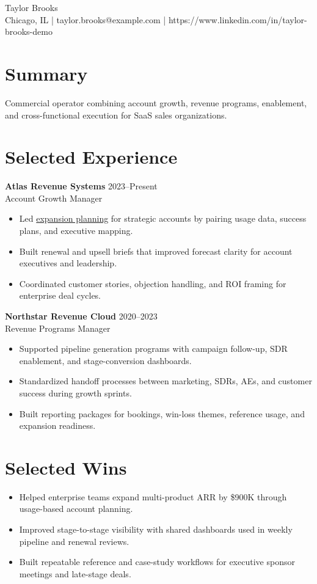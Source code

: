 \documentclass[10pt]{article}
\begin{document}
\begin{center}
  {\LARGE Taylor Brooks}\\
  Chicago, IL \quad | \quad taylor.brooks@example.com \quad | \quad
  https://www.linkedin.com/in/taylor-brooks-demo
\end{center}

\section*{Summary}
Commercial operator combining account growth, revenue programs, enablement, and
cross-functional execution for SaaS sales organizations.

\section*{Selected Experience}
\textbf{Atlas Revenue Systems} \hfill 2023--Present\\
Account Growth Manager
\begin{itemize}
  \item Led \underline{expansion planning} for strategic accounts by pairing usage data, success plans, and executive mapping.
  \item Built renewal and upsell briefs that improved forecast clarity for account executives and leadership.
  \item Coordinated customer stories, objection handling, and ROI framing for enterprise deal cycles.
\end{itemize}

\textbf{Northstar Revenue Cloud} \hfill 2020--2023\\
Revenue Programs Manager
\begin{itemize}
  \item Supported pipeline generation programs with campaign follow-up, SDR enablement, and stage-conversion dashboards.
  \item Standardized handoff processes between marketing, SDRs, AEs, and customer success during growth sprints.
  \item Built reporting packages for bookings, win-loss themes, reference usage, and expansion readiness.
\end{itemize}

\section*{Selected Wins}
\begin{itemize}
  \item Helped enterprise teams expand multi-product ARR by \$900K through usage-based account planning.
  \item Improved stage-to-stage visibility with shared dashboards used in weekly pipeline and renewal reviews.
  \item Built repeatable reference and case-study workflows for executive sponsor meetings and late-stage deals.
\end{itemize}
\end{document}

